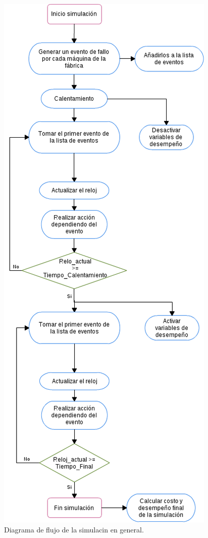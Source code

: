 \documentclass[12pt]{article}
\begin{document}
\begin{figure}
  \centering
    \includegraphics[scale=0.6]{Simulacion_flujo.png}
  \caption{Diagrama de flujo de la simulacin en general.}
  \label{fig:simulacion}
\end{figure}
\end{document}
